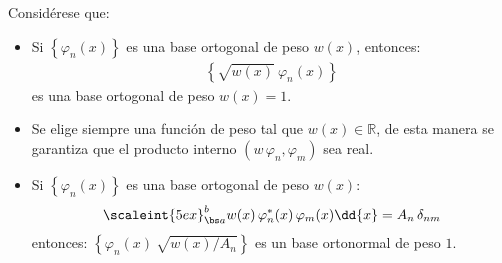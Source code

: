 \vfill{}
Considérese que:
\begin{itemize}
\item Si $\left\{ \varphi_{n} (x) \right\}$ es una base ortogonal de peso $w(x)$, entonces: 
\begin{align*}
\left\{ \sqrt{w(x)} \: \varphi_{n} (x) \right\}
\end{align*}
es una base ortogonal de peso $w(x) = 1$.
\item Se elige siempre una función de peso tal que $w(x) \in \mathbb{R}$, de esta manera se garantiza que el producto interno $(w \, \varphi_{n}, \varphi_{m})$ sea real.
\item Si $\left\{ \varphi_{n} (x) \right\}$ es una base ortogonal de peso $w(x)$:
\begin{align*}
\scaleint{5ex}_{\bs a}^{b} w(x) \,  \varphi_{n}^{*} (x) \, \varphi_{m} (x) \dd{x} = A_{n} \, \delta_{nm}
\end{align*}
entonces: $\left\{ \varphi_{n} (x) \: \sqrt{w(x) / A_{n}} \right\}$ es un base ortonormal de peso $1$.
\end{itemize}

